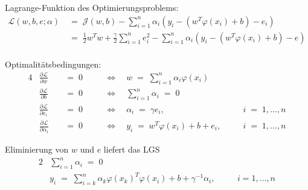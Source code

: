 \documentclass{beamer}
\begin{document}
{\begin{frame}
	Lagrange-Funktion des Optimierungsproblems:
	\begin{align}
		\mathcal{L}(w,b,e;\alpha)&\;=\;\mathcal{J}(w,b)-\sum_{i=1}^{n}\alpha_i\left(y_i-\left(w^T\varphi(x_i)+b\right)-e_i\right)\\
		&\;=\;\frac{1}{2}w^Tw+\frac{\gamma}{2}\sum_{i=1}^{n}e_i^2-\sum_{i=1}^{n}\alpha_i\left(y_i-\left(w^T\varphi(x_i)+b\right)-e\right)\\
	\end{align}
\end{frame}

\begin{frame}
	Optimalitätsbedingungen:
	\begin{alignat}{4}
		& \frac{\partial \mathcal{L}}{\partial w} &&\;=\;0 && \quad\Leftrightarrow\quad w\;=\;\sum_{i=1}^{n}\alpha_i\varphi(x_i) && \\[0,3cm]
		& \frac{\partial \mathcal{L}}{\partial b} &&\;=\;0 && \quad\Leftrightarrow\quad \sum_{i=1}^{n}\alpha_i\;=\;0 && \\[0,3cm]
		& \frac{\partial \mathcal{L}}{\partial e_i} &&\;=\;0 && \quad\Leftrightarrow\quad \alpha_i\;=\;\gamma e_i, && i\;=\;1,\dots,n\\[0,3cm]
		& \frac{\partial \mathcal{L}}{\partial \alpha_i} &&\;=\;0 && \quad\Leftrightarrow\quad y_i\;=\;w^T\varphi(x_i)+b+e_i,\quad && i\;=\;1,\dots,n
	\end{alignat}
\end{frame}

\begin{frame}
	Eliminierung von $w$ und $e$ liefert das LGS
	\begin{alignat}{2}
		&\sum_{i=1}^{n}\alpha_i \;=\;0 && \\
		&y_i\;=\;\sum_{i=k}^{n}\alpha_k\varphi(x_k)^T\varphi(x_i)+b+\gamma^{-1}\alpha_i,\quad && i=1,\dots,n
	\end{alignat}
\end{frame}

}
\end{document}
